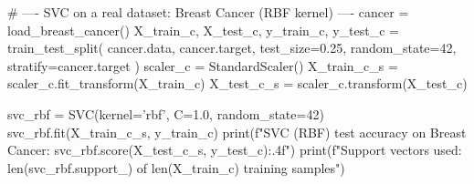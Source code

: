 \begin{codebox}[title={SVC on a real dataset: Breast Cancer (RBF kernel)}]
# ---- SVC on a real dataset: Breast Cancer (RBF kernel) ----
cancer = load_breast_cancer()
X_train_c, X_test_c, y_train_c, y_test_c = train_test_split(
    cancer.data, cancer.target, test_size=0.25, random_state=42, stratify=cancer.target
)
scaler_c = StandardScaler()
X_train_c_s = scaler_c.fit_transform(X_train_c)
X_test_c_s = scaler_c.transform(X_test_c)

svc_rbf = SVC(kernel='rbf', C=1.0, random_state=42)
svc_rbf.fit(X_train_c_s, y_train_c)
print(f"SVC (RBF) test accuracy on Breast Cancer: {svc_rbf.score(X_test_c_s, y_test_c):.4f}")
print(f"Support vectors used: {len(svc_rbf.support_)} of {len(X_train_c)} training samples")
\end{codebox}

